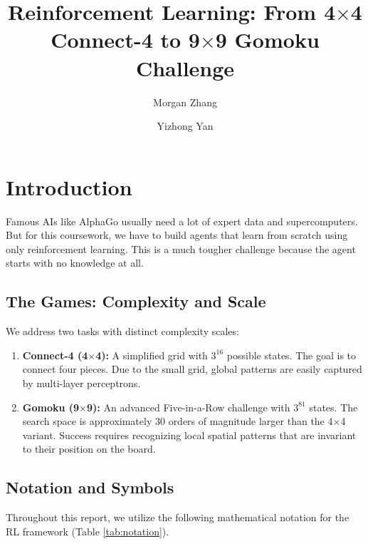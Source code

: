 \documentclass[9pt,a4paper,twocolumn,twoside]{rho-class/rho}
\title{Reinforcement Learning: From 4$\times$4 Connect-4 to 9$\times$9 Gomoku Challenge}
\author[a,1]{Morgan Zhang}
\author[b,2]{Yizhong Yan}
\affil[a]{zcabhbi@ucl.ac.uk}
\affil[b]{yizhong.yan.24@ucl.ac.uk}
\begin{document}
    \maketitle
    \thispagestyle{firststyle}

\section{Introduction}
    Famous AIs like AlphaGo usually need a lot of expert data and supercomputers. But for this coursework, we have to build agents that learn from scratch using only reinforcement learning. This is a much tougher challenge because the agent starts with no knowledge at all.

    \subsection{The Games: Complexity and Scale}
        We address two tasks with distinct complexity scales:
        \begin{enumerate}
            \item \textbf{Connect-4 (4$\times$4):} A simplified grid with $3^{16}$ possible states. The goal is to connect four pieces. Due to the small grid, global patterns are easily captured by multi-layer perceptrons.
            \item \textbf{Gomoku (9$\times$9):} An advanced Five-in-a-Row challenge with $3^{81}$ states. The search space is approximately 30 orders of magnitude larger than the 4$\times$4 variant. Success requires recognizing local spatial patterns that are invariant to their position on the board.
        \end{enumerate}

    \subsection{Notation and Symbols}
        Throughout this report, we utilize the following mathematical notation for the RL framework (Table \ref{tab:notation}).
\end{document}
